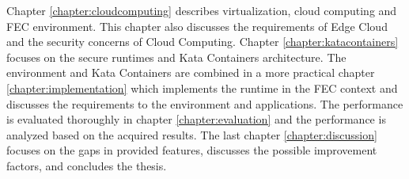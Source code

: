 Chapter \ref{chapter:cloudcomputing} describes virtualization, cloud computing and FEC environment. This chapter also discusses the requirements of Edge Cloud and the security concerns of Cloud Computing. Chapter \ref{chapter:katacontainers} focuses on the secure runtimes and Kata Containers architecture. The environment and Kata Containers are combined in a more practical chapter \ref{chapter:implementation} which implements the runtime in the FEC context and discusses the requirements to the environment and applications. The performance is evaluated thoroughly in chapter \ref{chapter:evaluation} and the performance is analyzed based on the acquired results. The last chapter \ref{chapter:discussion} focuses on the gaps in provided features, discusses the possible improvement factors, and concludes the thesis.